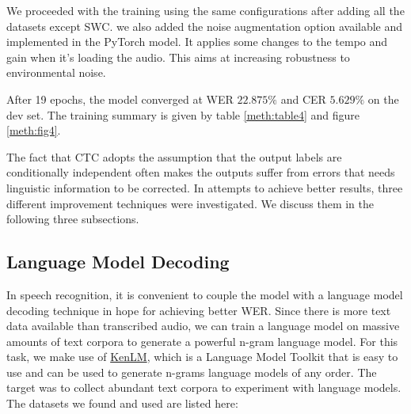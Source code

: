 We proceeded with the training using the same configurations after adding all the datasets except \ac{SWC}. we also added the noise augmentation option available and implemented in the PyTorch model. It applies some changes to the tempo and gain when it's loading the audio. This aims at increasing robustness to environmental noise.


After 19 epochs, the model converged at \ac{WER} $22.875\%$ and \ac{CER} $5.629\%$ on the dev set. The training summary is given by table \ref{meth:table4} and figure \ref{meth:fig4}.


The fact that \ac{CTC} adopts the assumption that the output labels are conditionally independent often makes the outputs suffer from errors that needs linguistic information to be corrected. In attempts to achieve better results, three different improvement techniques were investigated. We discuss them in the following three subsections.



\subsection{Language Model Decoding}
\label{meth:s4_sub5}

In speech recognition, it is convenient to couple the model with a language model decoding technique in hope for achieving better \ac{WER}. Since there is more text data available than transcribed audio, we can train a language model on massive amounts of text corpora to generate a powerful n-gram language model. For this task, we make use of \href{https://kheafield.com/code/kenlm/}{KenLM}, which is a Language Model Toolkit that is easy to use and can be used to generate n-grams language models of any order. The target was to collect abundant text corpora to experiment with language models. The datasets we found and used are listed here:

